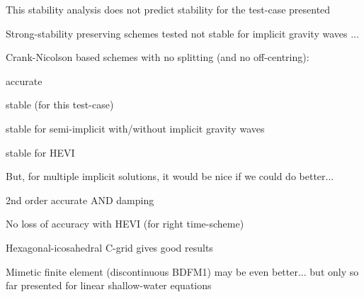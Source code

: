 \begin{slide}

\begin{list0}
    \item This stability analysis does not predict stability for the test-case presented
    \pauseHS
    \item Strong-stability preserving schemes tested not stable for implicit gravity waves ...\pauseHS
    \item Crank-Nicolson based schemes with no splitting (and no off-centring):\pauseHS
    \begin{list1}
        \item accurate
        \item stable (for this test-case)
        \item stable for semi-implicit with/without implicit gravity waves
       \item stable for HEVI
    \end{list1}\pauseHS
    \item But, for multiple implicit solutions, it would be nice if we could do better...
    \begin{list1}
        \item 2nd order accurate AND damping
    \end{list1}\pauseHS
    
    \item No loss of accuracy with HEVI (for right time-scheme)\pauseHS
\end{list0}



\begin{list0}
\item Hexagonal-icosahedral C-grid gives good results\pauseHS
\item Mimetic finite element (discontinuous BDFM1) may be even better... but only so far presented for linear shallow-water equations
\end{list0}

\end{slide}

